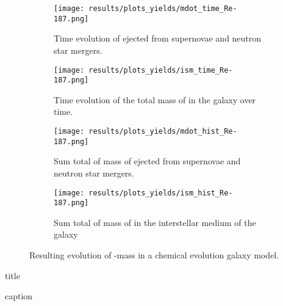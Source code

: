 \begin{figure}
  \begin{subfigure}{\subfigwidth}
    \centering
    \texttt{[image: results/plots\_yields/mdot\_time\_Re-187.png]}
    \caption{Time evolution of  ejected from supernovae and neutron star mergers.}
  \end{subfigure}
  \begin{subfigure}{\subfigwidth}
    \centering
    \texttt{[image: results/plots\_yields/ism\_time\_Re-187.png]}
    \caption{Time evolution of the total mass of  in the galaxy over time.}
  \end{subfigure}
  \begin{subfigure}{\subfigwidth}
    \centering
    \texttt{[image: results/plots\_yields/mdot\_hist\_Re-187.png]}
    \caption{Sum total of mass of  ejected from supernovae and neutron star mergers.}
  \end{subfigure}
  \begin{subfigure}{\subfigwidth}
    \centering
    \texttt{[image: results/plots\_yields/ism\_hist\_Re-187.png]}
    \caption{Sum total of mass of  in the interstellar medium of the galaxy}
  \end{subfigure}
  \caption{Resulting evolution of -mass in a chemical evolution galaxy model.}
\end{figure}
\begin{table}
  \centering
  \caption*{title}
  
  \caption{caption}
\end{table}

\FloatBarrier
